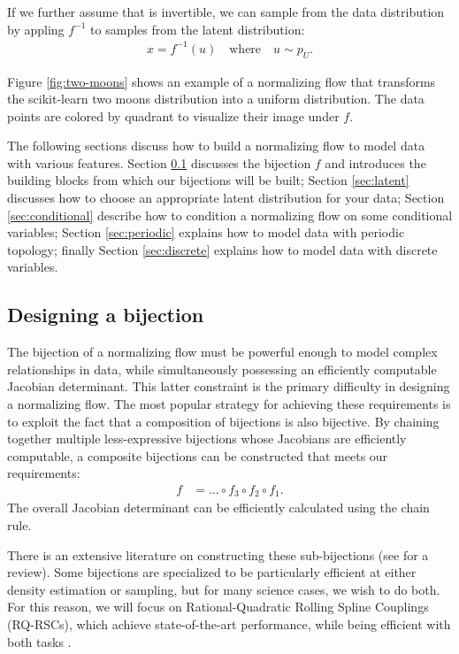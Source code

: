 \documentclass[twocolumn]{aastex631}
\newcommand{\pu}{p^{}_{U}}
\begin{document}
If we further assume that is invertible, we can sample from the data distribution by appling $f^{-1}$ to samples from the latent distribution:
\begin{align}
    x = f^{-1}(u) \quad \text{where} \quad u \sim \pu.
\end{align}

Figure \ref{fig:two-moons} shows an example of a normalizing flow that transforms the scikit-learn \citep{sklearn} two moons distribution into a uniform distribution.
The data points are colored by quadrant to visualize their image under $f$.

The following sections discuss how to build a normalizing flow to model data with various features.
Section \ref{sec:bijections} discusses the bijection $f$ and introduces the building blocks from which our bijections will be built;
Section \ref{sec:latent} discusses how to choose an appropriate latent distribution for your data;
Section \ref{sec:conditional} describe how to condition a normalizing flow on some conditional variables;
Section \ref{sec:periodic} explains how to model data with periodic topology;
finally Section \ref{sec:discrete} explains how to model data with discrete variables.


\subsection{Designing a bijection}
\label{sec:bijections}

The bijection of a normalizing flow must be powerful enough to model complex relationships in data, while simultaneously possessing an efficiently computable Jacobian determinant.
This latter constraint is the primary difficulty in designing a normalizing flow.
The most popular strategy for achieving these requirements is to exploit the fact that a composition of bijections is also bijective.
By chaining together multiple less-expressive bijections whose Jacobians are efficiently computable, a composite bijections can be constructed that meets our requirements:
\begin{align}
    f &= \dots \circ f_3 \circ f_2 \circ f_1.
\end{align}
The overall Jacobian determinant can be efficiently calculated using the chain rule.

There is an extensive literature on constructing these sub-bijections (see \citealt{kobyzev2020} for a review).
Some bijections are specialized to be particularly efficient at either density estimation or sampling, but for many science cases, we wish to do both.
For this reason, we will focus on Rational-Quadratic Rolling Spline Couplings (RQ-RSCs), which achieve state-of-the-art performance, while being efficient with both tasks \citep{durkan2019}.
\end{document}
